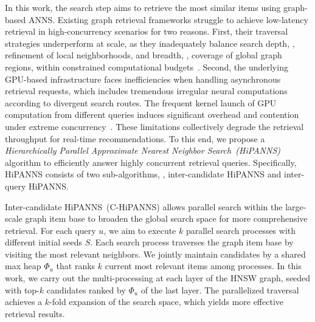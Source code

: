 In this work, the search step aims to retrieve the most similar items using graph-based ANNS.
Existing graph retrieval frameworks struggle to achieve low-latency retrieval in high-concurrency scenarios for two reasons.
First, their traversal strategies underperform at scale, as they inadequately balance search depth, \ie, refinement of local neighborhoods, and breadth, \ie, coverage of global graph regions, within constrained computational budgets~\cite{ootomo2024cagra}.
Second, the underlying GPU-based infrastructure faces inefficiencies when handling asynchronous retrieval requests, which includes tremendous irregular neural computations according to divergent search routes. The frequent kernel launch of GPU computation from different queries induces significant overhead and contention under extreme concurrency~\cite{pan2023recom}.
These limitations collectively degrade the retrieval throughput for real-time recommendations.
To this end, we propose a \textit{Hierarchically Parallel Approximate Nearest Neighbor Search~(HiPANNS)} algorithm to efficiently answer highly concurrent retrieval queries.
Specifically, HiPANNS consists of two sub-algorithms, \ie, inter-candidate HiPANNS and inter-query HiPANNS.

Inter-candidate HiPANNS~(C-HiPANNS) allows parallel search within the large-scale graph item base to broaden the global search space for more comprehensive retrieval.
For each query $u$, we aim to execute $k$ parallel search processes with different initial seeds $S$.
Each search process traverses the graph item base by visiting the most relevant neighbors.
We jointly maintain candidates by a shared max heap $\Phi_u$ that ranks $k$ current most relevant items among processes.
In this work, we carry out the multi-processing at each layer of the HNSW graph, seeded with top-$k$ candidates ranked by $\Phi_u$ of the last layer.
The parallelized traversal achieves a $k$-fold expansion of the search space, which yields more effective retrieval results.

